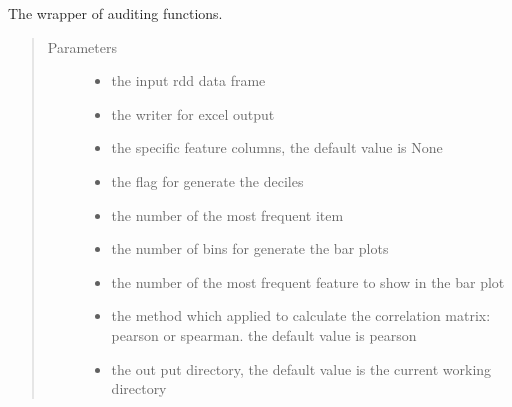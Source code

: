 \documentclass[letterpaper,12pt,english]{sphinxmanual}
\begin{document}
\begin{fulllineitems}
The wrapper of auditing functions.
\begin{quote}\begin{description}
\item[{Parameters}] \leavevmode\begin{itemize}
\item {} 
 \textendash{} the input rdd data frame

\item {} 
 \textendash{} the writer for excel output

\item {} 
 \textendash{} the specific feature columns, the default value is None

\item {} 
 \textendash{} the flag for generate the deciles

\item {} 
 \textendash{} the number of the most frequent item

\item {} 
 \textendash{} the number of bins for generate the bar plots

\item {} 
 \textendash{} the number of the most frequent feature to show in the bar plot

\item {} 
 \textendash{} the method which applied to calculate the correlation matrix: pearson or spearman.
the default value is pearson

\item {} 
 \textendash{} the out put directory, the default value is the current working directory


\end{itemize}
\end{description}
\end{quote}
\end{fulllineitems}
\end{document}
